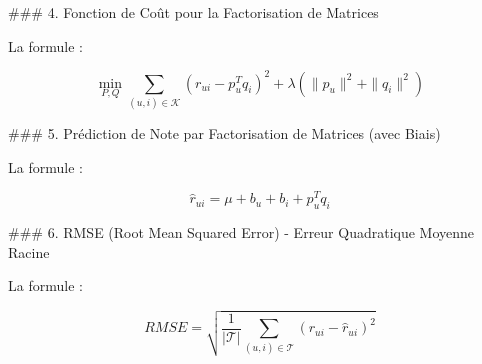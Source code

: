 ### 4. Fonction de Coût pour la Factorisation de Matrices

La formule :

\[
\min_{P,Q} \sum_{(u,i) \in \mathcal{K}} \left( r_{ui} - p_u^T q_i \right)^2 + \lambda \left( \|p_u\|^2 + \|q_i\|^2 \right)
\]

### 5. Prédiction de Note par Factorisation de Matrices (avec Biais)

La formule :

\[
\hat{r}_{ui} = \mu + b_u + b_i + p_u^T q_i
\]

### 6. RMSE (Root Mean Squared Error) - Erreur Quadratique Moyenne Racine

La formule :

\[
RMSE = \sqrt{\frac{1}{|\mathcal{T}|} \sum_{(u,i) \in \mathcal{T}} \left( r_{ui} - \hat{r}_{ui} \right)^2}
\]
